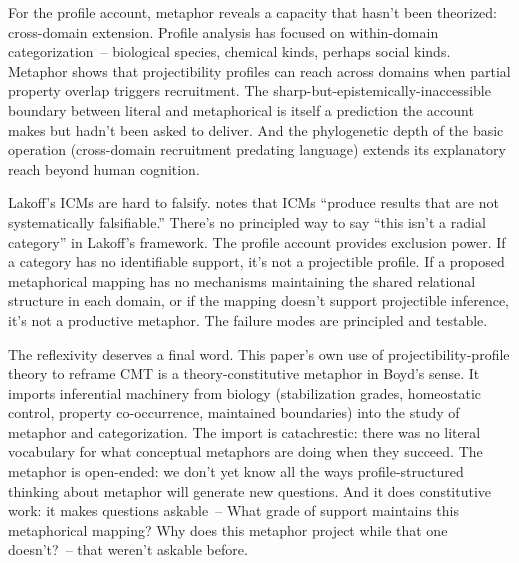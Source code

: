 \documentclass[12pt]{article}
\begin{document}
For the profile account, metaphor reveals a capacity that hasn't been theorized: cross-domain extension. Profile analysis has focused on within-domain categorization~-- biological species, chemical kinds, perhaps social kinds. Metaphor shows that projectibility profiles can reach across domains when partial property overlap triggers recruitment. The sharp-but-epistemically-inaccessible boundary between literal and metaphorical is itself a prediction the account makes but hadn't been asked to deliver. And the phylogenetic depth of the basic operation (cross-domain recruitment predating language) extends its explanatory reach beyond human cognition.

Lakoff's ICMs are hard to falsify. \textcite{glynn2010} notes that ICMs \enquote{produce results that are not systematically falsifiable.} There's no principled way to say \enquote{this isn't a radial category} in Lakoff's framework. The profile account provides exclusion power. If a category has no identifiable support, it's not a projectible profile. If a proposed metaphorical mapping has no mechanisms maintaining the shared relational structure in each domain, or if the mapping doesn't support projectible inference, it's not a productive metaphor. The failure modes are principled and testable.

The reflexivity deserves a final word. This paper's own use of projectibility-profile theory to reframe CMT is a theory-constitutive metaphor in Boyd's sense. It imports inferential machinery from biology (stabilization grades, homeostatic control, property co-occurrence, maintained boundaries) into the study of metaphor and categorization. The import is catachrestic: there was no literal vocabulary for what conceptual metaphors are doing when they succeed. The metaphor is open-ended: we don't yet know all the ways profile-structured thinking about metaphor will generate new questions. And it does constitutive work: it makes questions askable~-- What grade of support maintains this metaphorical mapping? Why does this metaphor project while that one doesn't?~-- that weren't askable before.
\end{document}
